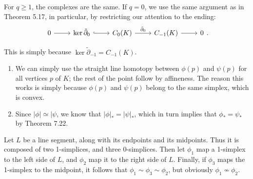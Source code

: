 \documentclass[../../solutions.tex]{subfiles}
\begin{document}
\begin{exercise} \leavevmode
For $q\ge1$, the complexes are the same.
If $q=0$, we use the same argument as in Theorem 5.17, in particular, by restricting our attention to the ending:
\[
\begin{tikzcd}
0\ar[r] & \ker\tilde\partial_0\ar[r,hookrightarrow] & C_0(K)\ar[r,"\tilde\partial_0"] & C_{-1}(K)\ar[r] & 0
\end{tikzcd}.
\]
\end{exercise}

\begin{exercise} \leavevmode
This is simply because $\ker\tilde\partial_{-1}=C_{-1}(K)$.
\end{exercise}

\begin{exercise} \leavevmode
\begin{enumerate}
\item
We can simply use the straight line homotopy between $\phi(p)$ and $\psi(p)$ for all vertices $p$ of $K$;
the rest of the point follow by affineness.
The reason this works is simply because $\phi(p)$ and $\psi(p)$ belong to the same simplex, which is convex.
\item
Since $|\phi|\simeq|\psi$, we know that $|\phi|_*=|\psi|_*$, which in turn implies that $\phi_*=\psi_*$ by Theorem 7.22.
\end{enumerate}
\end{exercise}

\begin{exercise} \leavevmode
Let $L$ be a line segment, along with its endpoints and its midpoints.
Thus it is composed of two 1-simplices, and three 0-simplices.
Then let $\phi_1$ map a 1-simplex to the left side of $L$, and $\phi_2$ map it to the right side of $L$.
Finally, if $\phi_3$ maps the 1-simplex to the midpoint, it follows that $\phi_1\sim\phi_3\sim\phi_2$, but obviously $\phi_1\not\sim\phi_2$.
\end{exercise}
\end{document}
